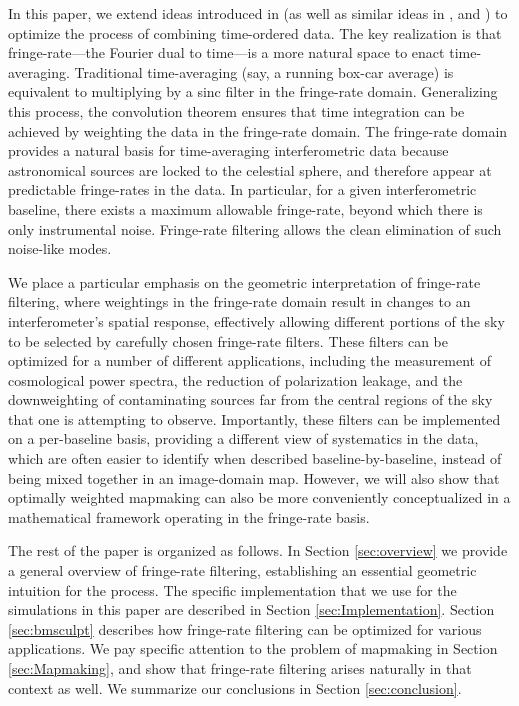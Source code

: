 \documentclass[twocolumn,apj,numberedappendix]{emulateapj}
\begin{document}
In this paper, we extend ideas introduced in \citet{parsons_backer2009} (as well as similar ideas in \citealt{roshi_and_perley2003}, \citealt{offringa_et_al2012} and \citealt{shaw_et_al2013}) to optimize the process of combining time-ordered data. The key realization is that fringe-rate---the Fourier dual to time---is a
more natural space to enact time-averaging. Traditional time-averaging (say, a running box-car average)
is equivalent to multiplying by a sinc filter in the fringe-rate domain. Generalizing this process, the
convolution theorem ensures that time integration can be achieved by 
weighting the data in the fringe-rate domain. The fringe-rate domain provides a natural basis for time-averaging interferometric
data because astronomical sources are locked to the celestial sphere, and therefore appear at
predictable fringe-rates in the data. In particular, for a given interferometric baseline, there exists
a maximum allowable fringe-rate, beyond which there is only instrumental noise. Fringe-rate filtering
allows the clean elimination of such noise-like modes.

We place a particular emphasis on the geometric interpretation of fringe-rate filtering,
where weightings in the fringe-rate domain result in changes to an interferometer's spatial response,
effectively allowing different portions of the sky to be selected by carefully chosen fringe-rate filters.
These filters can be optimized for a number of different applications, including the measurement
of cosmological power spectra, the reduction of polarization leakage, and the downweighting of
contaminating sources far from the central regions of the sky that one is attempting to observe.
Importantly, these filters can be implemented on a per-baseline basis, providing a different view
of systematics in the data, which are often easier to identify when described baseline-by-baseline,
instead of being mixed together in an image-domain map. However, we will also show that 
optimally weighted mapmaking can also be more conveniently conceptualized in a mathematical
framework operating in the fringe-rate basis.

The rest of the paper is organized as follows. In Section \ref{sec:overview} we provide a general
overview of fringe-rate filtering, establishing an essential geometric intuition for the process. The
specific implementation that we use for the simulations in this paper are described in Section
\ref{sec:Implementation}. Section \ref{sec:bmsculpt} describes how fringe-rate filtering can be
optimized for various applications. We pay specific attention to the problem of mapmaking in
Section \ref{sec:Mapmaking}, and show that fringe-rate filtering arises naturally in that context as well.
We summarize our conclusions in Section \ref{sec:conclusion}.
\end{document}

